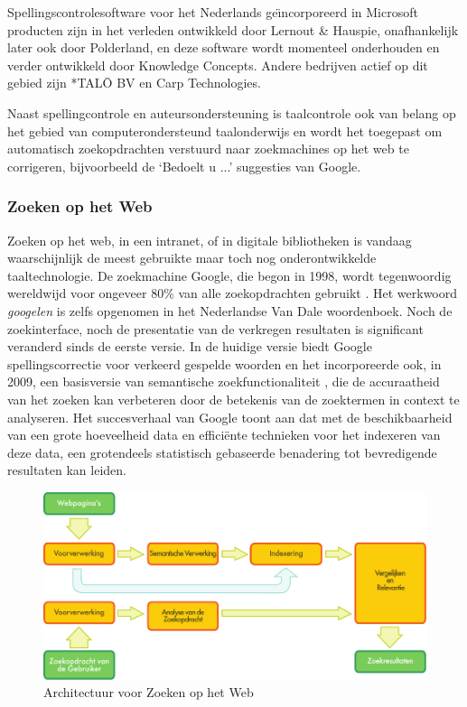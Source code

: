 \begin{multicols}{2}
    Spellingscontrolesoftware voor het Nederlands ge{\"\i}ncorporeerd in Microsoft producten zijn in het verleden ontwikkeld door Lernout \& Hauspie, onafhankelijk later ook door Polderland, en deze software wordt momenteel onderhouden en verder ontwikkeld door Knowledge Concepts. Andere bedrijven actief op dit gebied zijn *TAL{\=O} BV en Carp Technologies.

    Naast spellingcontrole en auteursondersteuning is taalcontrole ook van belang op het gebied van computerondersteund taalonderwijs en wordt het toegepast om automatisch zoekopdrachten verstuurd naar zoekmachines op het web te corrigeren, bijvoorbeeld de `Bedoelt u ...' suggesties van Google.

\subsubsection{Zoeken op het Web}

 Zoeken op het web, in een intranet, of in digitale bibliotheken is vandaag waarschijnlijk de meest gebruikte maar toch nog onderontwikkelde taaltechnologie. De zoekmachine Google, die begon in 1998, wordt tegenwoordig wereldwijd voor ongeveer 80\% van alle zoekopdrachten gebruikt \cite{Spiegel}. Het werkwoord \emph{googelen} is zelfs opgenomen in het Nederlandse Van Dale woordenboek. Noch de zoekinterface, noch de presentatie van de verkregen resultaten is significant veranderd sinds de eerste versie. In de huidige versie biedt Google spellingscorrectie voor verkeerd gespelde woorden en het incorporeerde ook, in 2009, een basisversie van semantische zoekfunctionaliteit \cite{GoogleSem}, die de accuraatheid van het zoeken kan verbeteren door de betekenis van de zoektermen in context te analyseren. Het succesverhaal van Google toont aan dat met de beschikbaarheid van een grote hoeveelheid data en effici{\"e}nte technieken voor het indexeren van deze data, een grotendeels statistisch gebaseerde benadering tot bevredigende resultaten kan leiden.

\begin{figure}[tb]
  \center
  \includegraphics[width=\textwidth]{../_media/dutch/web_search_architecture}
  \vspace{-5mm}
  \caption{Architectuur voor Zoeken op het Web}
  \label{fig:websearcharch_de}
\end{figure}


\end{multicols}
